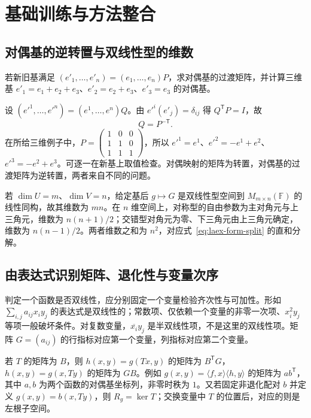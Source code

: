 \section{基础训练与方法整合}
\label{sec:laex-bilinear-training}

\subsection{对偶基的逆转置与双线性型的维数}

\begin{example}
\label{ex:laex-dual-basis-change}
若新旧基满足 $(e'_1,\ldots,e'_n)=(e_1,\ldots,e_n)P$，求对偶基的过渡矩阵，并计算三维基 $e'_1=e_1+e_2+e_3$、$e'_2=e_2+e_3$、$e'_3=e_3$ 的对偶基。
\end{example}
\begin{solve}
设 $(e'^1,\ldots,e'^n)=(e^1,\ldots,e^n)Q$。由 $e'^i(e'_j)=\delta_{ij}$ 得 $Q^{\mathsf T}P=I$，故
\begin{equation}
 Q=P^{-\mathsf T}.
 \label{eq:laex-dual-basis-change}
\end{equation}
在所给三维例子中，$P=\begin{pmatrix}1&0&0\\1&1&0\\1&1&1\end{pmatrix}$，所以 $e'^1=e^1$、$e'^2=-e^1+e^2$、$e'^3=-e^2+e^3$。可逐一在新基上取值检查。对偶映射的矩阵为转置，对偶基的过渡矩阵为逆转置，两者来自不同的问题。
\end{solve}

若 $\dim U=m$、$\dim V=n$，给定基后 $g\mapsto G$ 是双线性型空间到 $M_{m\times n}(\mathbb F)$ 的线性同构，故其维数为 $mn$。在 $n$ 维空间上，对称型的自由参数为主对角元与上三角元，维数为 $n(n+1)/2$；交错型对角元为零、下三角元由上三角元确定，维数为 $n(n-1)/2$。两者维数之和为 $n^2$，对应式~\eqref{eq:laex-form-split} 的直和分解。

\subsection{由表达式识别矩阵、退化性与变量次序}

判定一个函数是否双线性，应分别固定一个变量检验齐次性与可加性。形如 $\sum_{i,j}a_{ij}x_iy_j$ 的表达式是双线性的；常数项、仅依赖一个变量的非零一次项、$x_i^2y_j$ 等项一般破坏条件。对复数变量，$\overline{x_i}y_j$ 是半双线性项，不是这里的双线性项。矩阵 $G=(a_{ij})$ 的行指标对应第一个变量，列指标对应第二个变量。

若 $T$ 的矩阵为 $B$，则 $h(x,y)=g(Tx,y)$ 的矩阵为 $B^{\mathsf T}G$，$h(x,y)=g(x,Ty)$ 的矩阵为 $GB$。例如 $g(x,y)=\langle f,x\rangle\langle h,y\rangle$ 的矩阵为 $ab^{\mathsf T}$，其中 $a,b$ 为两个函数的对偶基坐标列，非零时秩为 $1$。又若固定非退化配对 $b$ 并定义 $g(x,y)=b(x,Ty)$，则 $R_g=\ker T$；交换变量中 $T$ 的位置后，对应的则是左根子空间。

